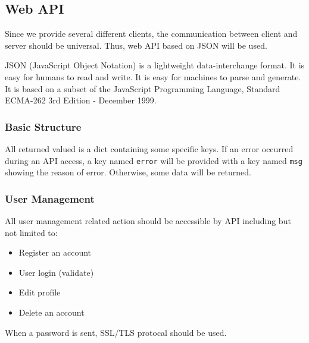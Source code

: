 \subsection{Web API}

Since we provide several different clients, the communication between
client and server should be universal. Thus, web API based on JSON will
be used.

JSON (JavaScript Object Notation) is a lightweight data-interchange
format. It is easy for humans to read and write. It is easy for machines
to parse and generate. It is based on a subset of the JavaScript
Programming Language, Standard ECMA-262 3rd Edition - December 1999.

\subsubsection{Basic Structure}

All returned valued is a dict containing some specific keys. If an error
occurred during an API access, a key named \texttt{error} will be
provided with a key named \texttt{msg} showing the reason of error.
Otherwise, some data will be returned.

\subsubsection{User Management}

All user management related action should be accessible by API including
but not limited to:

\begin{itemize}
\itemsep1pt\parskip0pt
\item
  Register an account
\item
  User login (validate)
\item
  Edit profile
\item
  Delete an account
\end{itemize}

When a password is sent, SSL/TLS protocal should be used.
